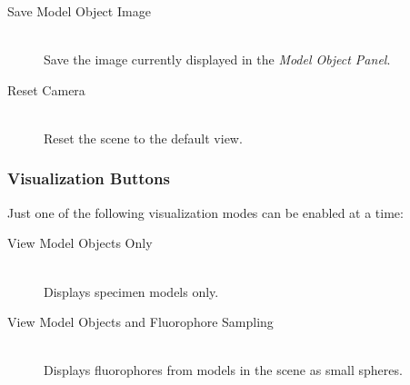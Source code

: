 \documentclass[11pt,titlepage,twoside]{article}
\begin{document}
\begin{description}

  \item[Save Model Object Image] \hfill \\
  Save the image currently displayed in the \emph{Model Object Panel}.
  
  \item[Reset Camera] \hfill \\
  Reset the scene to the default view.
  
\end{description}

\subsubsection{Visualization Buttons}

Just one of the following visualization modes can be enabled at a time:

\begin{description}

  \item[View Model Objects Only] \hfill \\
  Displays specimen models only.

  \item[View Model Objects and Fluorophore Sampling] \hfill \\
  Displays fluorophores from models in the scene as small spheres.


  
  
  
\end{description}
  
\end{document}
